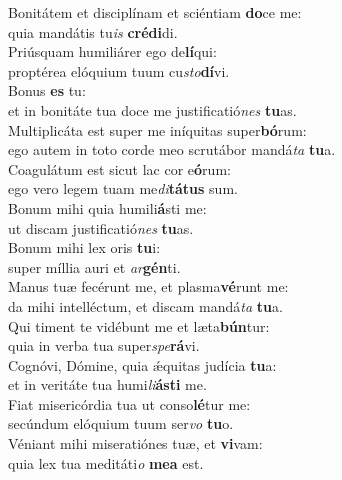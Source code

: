 \evenverse Bonitátem et disciplínam et sciéntiam \textbf{do}ce me:~\*\\
\evenverse quia mandátis tu\textit{is} \textbf{cré}\textbf{di}di.\\
\oddverse Priúsquam humiliárer ego de\textbf{lí}qui:~\*\\
\oddverse proptérea elóquium tuum cu\textit{sto}\textbf{dí}vi.\\
\evenverse Bonus \textbf{es} tu:~\*\\
\evenverse et in bonitáte tua doce me justificatió\textit{nes} \textbf{tu}as.\\
\oddverse Multiplicáta est super me iníquitas super\textbf{bó}rum:~\*\\
\oddverse ego autem in toto corde meo scrutábor mandá\textit{ta} \textbf{tu}a.\\
\evenverse Coagulátum est sicut lac cor e\textbf{ó}rum:~\*\\
\evenverse ego vero legem tuam me\textit{di}\textbf{tá}\textbf{tus} sum.\\
\oddverse Bonum mihi quia humili\textbf{á}sti me:~\*\\
\oddverse ut discam justificatió\textit{nes} \textbf{tu}as.\\
\evenverse Bonum mihi lex oris \textbf{tu}i:~\*\\
\evenverse super míllia auri et \textit{ar}\textbf{gén}ti.\\
\oddverse Manus tuæ fecérunt me, et plasma\textbf{vé}runt me:~\*\\
\oddverse da mihi intelléctum, et discam mandá\textit{ta} \textbf{tu}a.\\
\evenverse Qui timent te vidébunt me et læta\textbf{bún}tur:~\*\\
\evenverse quia in verba tua super\textit{spe}\textbf{rá}vi.\\
\oddverse Cognóvi, Dómine, quia ǽquitas judícia \textbf{tu}a:~\*\\
\oddverse et in veritáte tua humi\textit{li}\textbf{á}\textbf{sti} me.\\
\evenverse Fiat misericórdia tua ut conso\textbf{lé}tur me:~\*\\
\evenverse secúndum elóquium tuum ser\textit{vo} \textbf{tu}o.\\
\oddverse Véniant mihi miseratiónes tuæ, et \textbf{vi}vam:~\*\\
\oddverse quia lex tua meditáti\textit{o} \textbf{me}\textbf{a} est.\\
